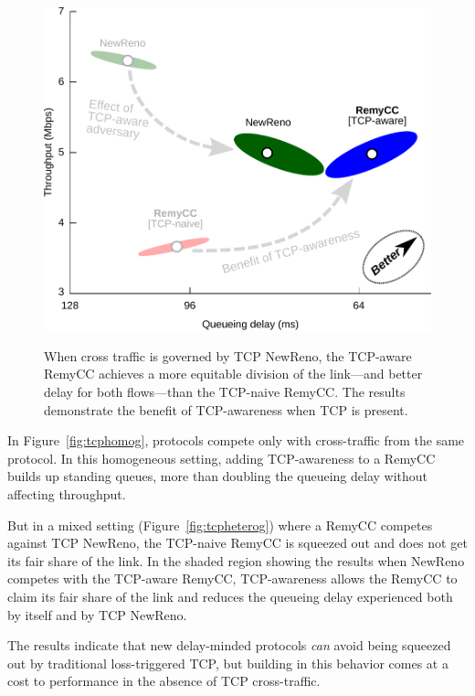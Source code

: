 \begin{figure}
\caption{When cross traffic is governed by TCP NewReno, the TCP-aware
  RemyCC achieves a more equitable division of the link---and better
  delay for both flows---than the TCP-naive RemyCC. The results
  demonstrate the benefit of TCP-awareness when TCP is present.}
\label{fig:tcpheterog}
\begin{center}
\includegraphics[width=\textwidth]{hetero-3.pdf}
\label{fig:tcpawarehetero}
\end{center}
\end{figure}

In Figure~\ref{fig:tcphomog}, protocols compete only with
cross-traffic from the same protocol. In this homogeneous setting,
adding TCP-awareness to a RemyCC builds up standing queues, more than
doubling the queueing delay without affecting throughput.

But in a mixed setting (Figure~\ref{fig:tcpheterog}) where a RemyCC
competes against TCP NewReno, the TCP-naive RemyCC is squeezed out and
does not get its fair share of the link. In the shaded region showing
the results when NewReno competes with the TCP-aware RemyCC,
TCP-awareness allows the RemyCC to claim its fair share of the link
and reduces the queueing delay experienced both by itself and by TCP
NewReno.

The results indicate that new delay-minded protocols \emph{can} avoid
being squeezed out by traditional loss-triggered TCP, but building in
this behavior comes at a cost to performance in the absence of TCP
cross-traffic.

